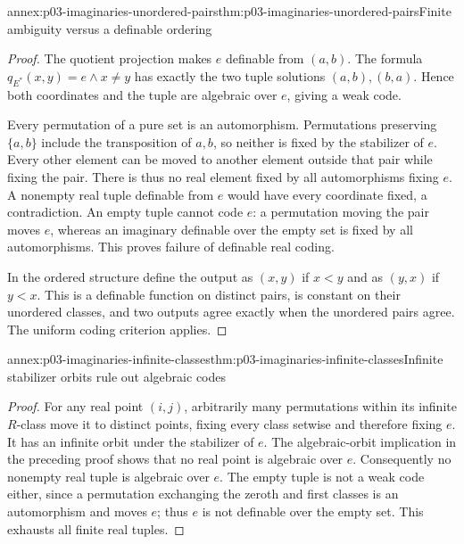 \begin{annexitem}{annex:p03-imaginaries-unordered-pairs}{thm:p03-imaginaries-unordered-pairs}{Finite ambiguity versus a definable ordering}
\begin{proof}
The quotient projection makes \(e\) definable from \((a,b)\).
The formula \(q_{E^*}(x,y)=e\land x\ne y\) has exactly the two
tuple solutions \((a,b),(b,a)\). Hence both coordinates and the tuple
are algebraic over \(e\), giving a weak code.

Every permutation of a pure set is an automorphism. Permutations preserving
\(\{a,b\}\) include the transposition of \(a,b\), so neither is
fixed by the stabilizer of \(e\). Every other element can be moved to
another element outside that pair while fixing the pair. There is thus no
real element fixed by all automorphisms fixing \(e\). A nonempty real
tuple definable from \(e\) would have every coordinate fixed, a contradiction.
An empty tuple cannot code \(e\): a permutation moving the pair moves
\(e\), whereas an imaginary definable over the empty set is fixed by all
automorphisms. This proves failure of definable real coding.

In the ordered structure define the output as \((x,y)\) if \(x<y\)
and as \((y,x)\) if \(y<x\). This is a definable function on distinct
pairs, is constant on their unordered classes, and two outputs agree exactly
when the unordered pairs agree. The uniform coding criterion applies.
\end{proof}
\end{annexitem}

\begin{annexitem}{annex:p03-imaginaries-infinite-classes}{thm:p03-imaginaries-infinite-classes}{Infinite stabilizer orbits rule out algebraic codes}
\begin{proof}
For any real point \((i,j)\), arbitrarily many permutations within its
infinite \(R\)-class move it to distinct points, fixing every class
setwise and therefore fixing \(e\). It has an infinite orbit under the
stabilizer of \(e\). The algebraic-orbit implication in the preceding
proof shows that no real point is algebraic over \(e\). Consequently no
nonempty real tuple is algebraic over \(e\). The empty tuple is not a
weak code either, since a permutation exchanging the zeroth and first classes
is an automorphism and moves \(e\); thus \(e\) is not definable over
the empty set. This exhausts all finite real tuples.
\end{proof}
\end{annexitem}

